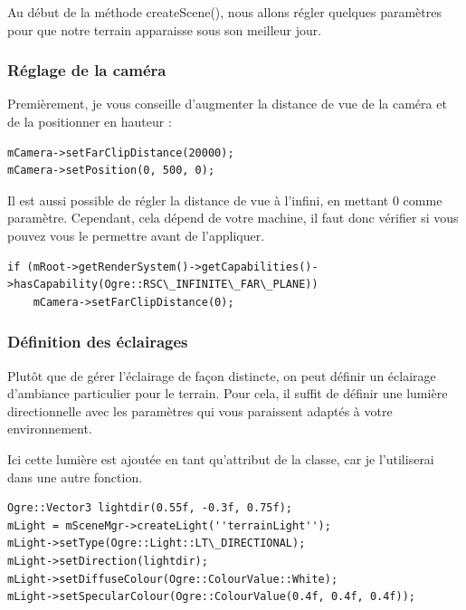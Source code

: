 \documentclass[10pt,a4paper]{report}
\begin{document}
Au d\'ebut de la m\'ethode createScene(), nous allons r\'egler quelques param\`etres pour que notre terrain apparaisse sous son meilleur jour.

\subsubsection{R\'eglage de la cam\'era}
Premi\`erement, je vous conseille d'augmenter la distance de vue de la cam\'era et de la positionner en hauteur :

\begin{lstlisting}[caption={R\'eglage de la cam\'era}]
mCamera->setFarClipDistance(20000);
mCamera->setPosition(0, 500, 0);
\end{lstlisting}

Il est aussi possible de r\'egler la distance de vue \`a l'infini, en mettant 0 comme param\`etre. Cependant, cela d\'epend de votre machine, il faut donc v\'erifier si vous pouvez vous le permettre avant de l'appliquer.

\begin{lstlisting}[caption={V\'erification et r\'eglages de vue \`a l'infini}]
if (mRoot->getRenderSystem()->getCapabilities()->hasCapability(Ogre::RSC\_INFINITE\_FAR\_PLANE))
    mCamera->setFarClipDistance(0);
\end{lstlisting}




\subsubsection{D\'efinition des \'eclairages}
Plut\^ot que de g\'erer l'\'eclairage de fa\c{c}on distincte, on peut d\'efinir un \'eclairage d'ambiance particulier pour le terrain. Pour cela, il suffit de d\'efinir une lumi\`ere directionnelle avec les param\`etres qui vous paraissent adapt\'es \`a votre environnement. 

Ici cette lumi\`ere est ajout\'ee en tant qu'attribut de la classe, car je l'utiliserai dans une autre fonction.

\begin{lstlisting}[caption={D\'efinition de l'\'eclairage pour le terrain}]
Ogre::Vector3 lightdir(0.55f, -0.3f, 0.75f);
mLight = mSceneMgr->createLight(''terrainLight'');
mLight->setType(Ogre::Light::LT\_DIRECTIONAL);
mLight->setDirection(lightdir);
mLight->setDiffuseColour(Ogre::ColourValue::White);
mLight->setSpecularColour(Ogre::ColourValue(0.4f, 0.4f, 0.4f));
\end{lstlisting}
\end{document}
